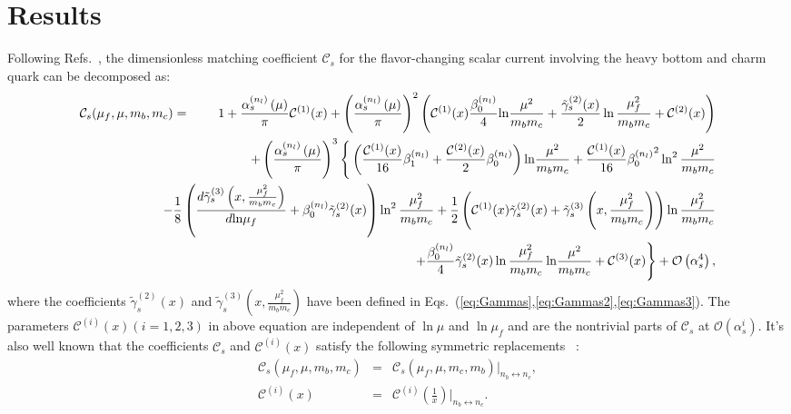 \documentclass[onecolumn,preprintnumbers,aps,superscriptaddress,nofootinbib,prd,notitlepage]{revtex4-1}
\newcommand{\beq}{\begin{eqnarray}}
\newcommand{\eeq}{\end{eqnarray}}
\newcommand{\non}{\nonumber\\ }
\begin{document}
{\section{Results~\label{Results}}

Following Refs.~\cite{Feng:2022vvk,Feng:2022ruy,Sang:2022tnh}, the dimensionless matching coefficient $\mathcal{C}_s$ for the flavor-changing scalar current involving the heavy bottom and charm quark
 can be decomposed as:
{\small
\beq
\mathcal{C}_s(\mu_f,\mu,m_b,m_c) &=&1+\frac{\alpha_s^{\left(n_l\right)}\left(\mu\right)}{\pi} \mathcal{C}^{(1)}(x)+\left(\frac{\alpha_s^{\left(n_l\right)}\left(\mu\right)}{\pi}\right)^2
\left(\mathcal{C}^{(1)}(x)\frac{\beta_0^{(n_l)}}{4}\text{ln}\frac{\mu^2}{m_b m_c}+\frac{\tilde{\gamma}_s^{(2)}(x)}{2}\ln \frac{\mu_f^2}{m_b m_c}+\mathcal{C}^{(2)}(x)\right) \non
&& \hspace{-1cm}+\left(\frac{\alpha_s^{\left(n_l\right)}\left(\mu\right)}{\pi}\right)^3\Bigg \{  \left(\frac{\mathcal{C}^{(1)}(x)}{16}\beta_1^{(n_l)}+\frac{\mathcal{C}^{(2)}(x)}{2}\beta_0^{(n_l)}\right)\text{ln}\frac{\mu^2}{m_b m_c}
+\frac{\mathcal{C}^{(1)}(x)}{16}{\beta_0^{(n_l)}}^2\ln^2 \frac{\mu^2}{m_b m_c}  \non
&& \hspace{-1cm} -\frac{1}{8}\left(\frac{d\tilde{\gamma}_s^{(3)}\left(x,\frac{\mu_f^2}{m_b m_c}\right)}{d \text{ln}\mu_f}+\beta_0^{(n_l)}\tilde{\gamma}_s^{(2)}(x)\right)\ln^2\frac{\mu_f^2}{m_b m_c}  +\frac{1}{2}\left(\mathcal{C}^{(1)}(x) \tilde{\gamma}_s^{(2)}(x)+\tilde{\gamma}_s^{(3)}\left(x,\frac{\mu_f^2}{m_b m_c}\right)\right)\ln\frac{\mu_f^2}{m_b m_c}  \non
&&  \hspace{-1cm}+\frac{\beta_{0}^{(n_l)}}{4}\tilde{\gamma}_s^{(2)}(x)\ln\frac{\mu_f^2}{m_b m_c}\,\text{ln}\frac{\mu^2}{m_b m_c} + \mathcal{C}^{(3)}(x) \Bigg\} +\mathcal{O}\left(\alpha_s^4\right), \label{eq:Cs01}
\eeq }
where the coefficients $\tilde{\gamma}_s^{(2)}(x)$ and $ \tilde{\gamma}_s^{(3)}\left(x,\frac{\mu_f^2}{m_b m_c}\right)$ have been defined in Eqs.~(\ref{eq:Gammas},\ref{eq:Gammas2},\ref{eq:Gammas3}).
The parameters $\mathcal{C}^{(i)}(x)(i=1,2,3)$ in above equation are  independent of $\ln \mu$ and $\ln \mu_f$ and are the nontrivial parts of $\mathcal{C}_s$ at $\mathcal{O}\left(\alpha_s^i\right)$.
It's also well known that the coefficients $\mathcal{C}_s$ and $\mathcal{C}^{(i)}(x)$ satisfy the following symmetric replacements ~\cite{Braaten:1995ej,Hwang:1999fc,Lee:2010ts,Onishchenko:2003ui,Chen:2015csa,Feng:2022ruy,Sang:2022tnh}:
\beq
\mathcal{C}_s(\mu_f,\mu,m_b,m_c)&=&\mathcal{C}_s(\mu_f,\mu,m_c,m_b)|_{n_b\leftrightarrow n_c}, \label{eq:Cs02} \\
\mathcal{C}^{(i)}(x)&=&\mathcal{C}^{(i)}\left(\frac{1}{x}\right)|_{n_b\leftrightarrow n_c}. \label{eq:Cs03}
\eeq

}
\end{document}
